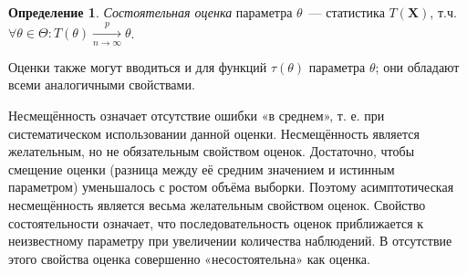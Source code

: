 \documentclass[oneside,final,14pt]{extreport}
\theoremstyle{definition}
\newtheorem{defn}{Определение}[section]
\begin{document}
\begin{defn}
{\it Состоятельная оценка} параметра $\theta$~--- статистика $T(\mathbf{X})$, т.ч. $\forall \theta \in \Theta: T(\theta) \xrightarrow[n \rightarrow \infty]{p} \theta$.
\end{defn}

Оценки также могут вводиться и для функций $\tau(\theta)$ параметра $\theta$; они обладают всеми аналогичными свойствами.

Несмещённость означает отсутствие ошибки «в среднем», т. е. при систематическом использовании данной оценки. Несмещённость является желательным, но не обязательным свойством оценок. Достаточно, чтобы смещение оценки (разница между её средним значением и истинным параметром) уменьшалось с ростом объёма выборки. Поэтому асимптотическая несмещённость является весьма желательным свойством оценок. Свойство состоятельности означает, что последовательность оценок приближается к неизвестному параметру при увеличении количества наблюдений. В отсутствие этого свойства оценка совершенно «несостоятельна» как оценка.
\end{document}
